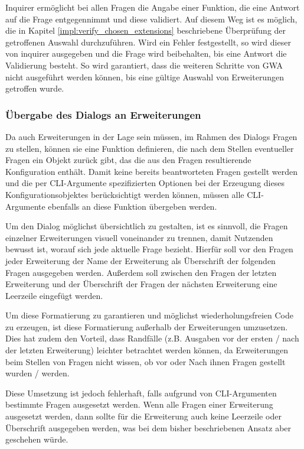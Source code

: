 Inquirer ermöglicht bei allen Fragen die Angabe einer Funktion, die eine Antwort auf die Frage entgegennimmt und diese validiert. Auf diesem Weg ist es möglich, die in Kapitel \ref{impl:verify_chosen_extensions} beschriebene Überprüfung der getroffenen Auswahl durchzuführen. Wird ein Fehler festgestellt, so wird dieser von inquirer ausgegeben und die Frage wird beibehalten, bis eine Antwort die Validierung besteht. So wird garantiert, dass die weiteren Schritte von \gls{GWA} nicht ausgeführt werden können, bis eine gültige Auswahl von Erweiterungen getroffen wurde.

\subsubsection{Übergabe des Dialogs an Erweiterungen}
\label{impl:extension_questions}

Da auch Erweiterungen in der Lage sein müssen, im Rahmen des Dialogs Fragen zu stellen, können sie eine Funktion definieren, die nach dem Stellen eventueller Fragen ein Objekt zurück gibt, das die aus den Fragen resultierende Konfiguration enthält. Damit keine bereits beantworteten Fragen gestellt werden und die per \gls{CLI}-Argumente spezifizierten Optionen bei der Erzeugung dieses Konfigurationsobjektes berücksichtigt werden können, müssen alle \gls{CLI}-Argumente ebenfalls an diese Funktion übergeben werden.

Um den Dialog möglichst übersichtlich zu gestalten, ist es sinnvoll, die Fragen einzelner Erweiterungen visuell voneinander zu trennen, damit Nutzenden bewusst ist, worauf sich jede aktuelle Frage bezieht. Hierfür soll vor den Fragen jeder Erweiterung der Name der Erweiterung als Überschrift der folgenden Fragen ausgegeben werden. Außerdem soll zwischen den Fragen der letzten Erweiterung und der Überschrift der Fragen der nächsten Erweiterung eine Leerzeile eingefügt werden.

Um diese Formatierung zu garantieren und möglichst wiederholungsfreien Code zu erzeugen, ist diese Formatierung außerhalb der Erweiterungen umzusetzen. Dies hat zudem den Vorteil, dass Randfälle (z.B. Ausgaben vor der ersten / nach der letzten Erweiterung) leichter betrachtet werden können, da Erweiterungen beim Stellen von Fragen nicht wissen, ob vor oder Nach ihnen Fragen gestellt wurden / werden.

Diese Umsetzung ist jedoch fehlerhaft, falls aufgrund von \gls{CLI}-Argumenten bestimmte Fragen ausgesetzt werden. Wenn alle Fragen einer Erweiterung ausgesetzt werden, dann sollte für die Erweiterung auch keine Leerzeile oder Überschrift ausgegeben werden, was bei dem bisher beschriebenen Ansatz aber geschehen würde.

